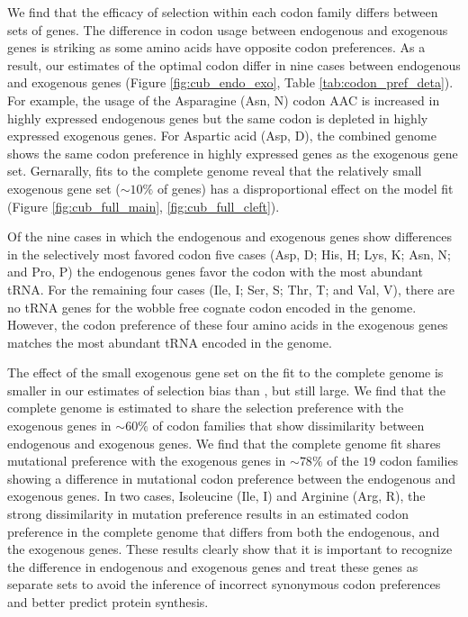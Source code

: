 \documentclass[fleqn,letterpaper]{article}
\begin{document}
We find that the efficacy of selection within each codon family differs between sets of genes.
The difference in codon usage between endogenous and exogenous genes is striking as some amino acids have opposite codon preferences. 
As a result, our estimates of the optimal codon differ in nine cases between endogenous and exogenous genes (Figure \ref{fig:cub_endo_exo}, Table \ref{tab:codon_pref_deta}).
For example, the usage of the Asparagine (Asn, N) codon AAC is increased in highly expressed endogenous genes but the same codon is depleted in highly expressed exogenous genes.
For Aspartic acid (Asp, D), the combined genome shows the same codon preference in highly expressed genes as the exogenous gene set.
Gernarally, fits to the complete \kluyveri genome reveal that the relatively small exogenous gene set ($\sim 10\%$ of genes) has a disproportional effect on the model fit (Figure \ref{fig:cub_full_main}, \ref{fig:cub_full_cleft}).

Of the nine cases in which the endogenous and exogenous genes show differences in the selectively most favored codon five cases (Asp, D; His, H; Lys, K; Asn, N; and Pro, P) the endogenous genes favor the codon with the most abundant tRNA.
For the remaining four cases (Ile, I; Ser, S; Thr, T; and Val, V), there are no tRNA genes for the wobble free cognate codon encoded in the \kluyveri genome.
However, the codon preference of these four amino acids in the exogenous genes matches the most abundant tRNA encoded in the \kluyveri genome.

The effect of the small exogenous gene set on the fit to the complete \kluyveri genome is smaller in our estimates of selection bias \DE than \DM, but still large.
We find that the complete \kluyveri genome is estimated to share the selection preference with the exogenous genes in $\sim60\%$ of codon families that show dissimilarity between endogenous and exogenous genes.
We find that the complete \kluyveri genome fit shares mutational preference with the exogenous genes in $\sim78\%$ of the $19$ codon families showing a difference in mutational codon preference between the endogenous and exogenous genes.
In two cases, Isoleucine (Ile, I) and Arginine (Arg, R), the strong dissimilarity in mutation preference results in an estimated codon preference in the complete \kluyveri genome that differs from both the endogenous, and the exogenous genes.
These results clearly show that it is important to recognize the difference in endogenous and exogenous genes and treat these genes as separate sets to avoid the inference of incorrect synonymous codon preferences and better predict protein synthesis.
\end{document}

